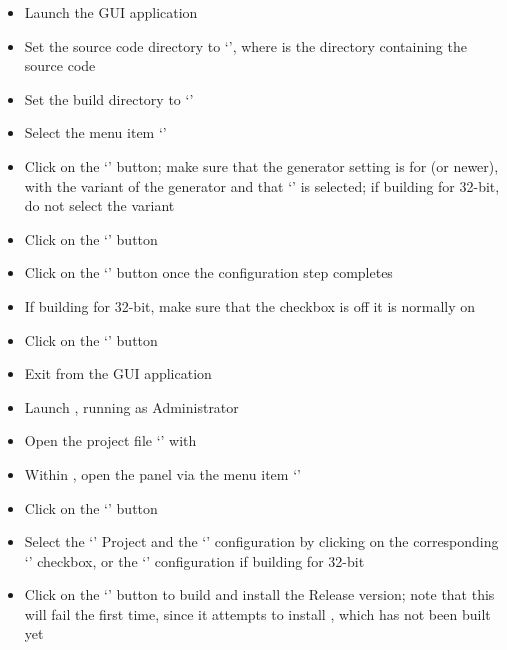 \begin{itemize}
\item Launch the  GUI application
\item\exSp{}Set the source code directory to
`', where 
is the directory containing the \mplusm{} source code
\item\exSp{}Set the build directory to
`'
\item\exSp{}Select the menu item `'
\item\exSp{}Click on the `' button; make sure that the generator
setting is for  (or newer), with the  variant of
the generator and that `' is selected; if building
for 32-bit, do not select the  variant
\item\exSp{}Click on the `' button
\item\exSp{}Click on the `' button once the configuration step
completes
\item\exSp{}If building for 32-bit, make sure that the checkbox  is off
\longDash{} it is normally on
\item\exSp{}Click on the `' button
\item\exSp{}Exit from the  GUI application
\item\exSp{}Launch , running as Administrator
\item\exSp{}Open the project file
`' with
\item\exSp{}Within , open the  panel via the
menu item `'
\item\exSp{}Click on the `' button
\item\exSp{}Select the `' Project and the `'
configuration by clicking on the corresponding `' checkbox, or the
`' configuration if building for 32-bit
\item\exSp{}Click on the `' button to build and install the Release
version; note that this will fail the first time, since it attempts to install
\textit{\MMMU}, which has not been built yet

\end{itemize}
